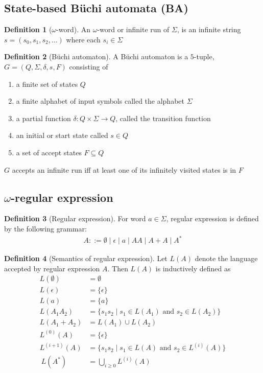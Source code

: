 \documentclass[preprint,12pt]{elsarticle}
\theoremstyle{definition}
\newtheorem{definition}{Definition}[section]
\theoremstyle{remark}
\newcommand{\Buchi}{B\"{u}chi }
\begin{document}
\subsection{State-based \Buchi automata (BA)}
\begin{definition}[$\omega$-word]
    An $\omega$-word or infinite run of $\Sigma$, is an infinite string $s = (s_0, s_1, s_2, \dots)$ where each $s_i\in \Sigma$
\end{definition}
\begin{definition}[\Buchi automaton]
    A \Buchi automaton is a $5$-tuple, $G = (Q, \Sigma, \delta, s, F)$ consisting of
    \begin{enumerate}
        \item a finite set of states $Q$
        \item a finite alphabet of input symbols called the alphabet $\Sigma$
        \item a partial function $\delta : Q\times \Sigma \to Q$, called the transition function
        \item an initial or start state called $s\in Q$
        \item a set of accept states $F \subseteq Q$
    \end{enumerate}
    $G$ accepts an infinite run iff at least one of its infinitely visited states is in $F$
\end{definition}

\subsection{$\omega$-regular expression}
\begin{definition}[Regular expression]
    For word $a \in \Sigma$, regular expression is defined by the following grammar:
    \begin{align*}
        A ::= \emptyset \mid \epsilon \mid a \mid AA \mid A + A \mid A^*
    \end{align*}
\end{definition}
\begin{definition}[Semantics of regular expression]
    Let $L(A)$ denote the language accepted by regular expression $A$. Then $L(A)$ is inductively defined as
    \begin{align*}
        L(\emptyset) & = \emptyset \\
        L(\epsilon) & = \{\epsilon\} \\
        L(a) & = \{a\} \\
        L(A_1A_2) & = \{s_1s_2 \mid s_1 \in L(A_1) \text{ and } s_2 \in L(A_2)\} \\
        L(A_1 + A_2) & = L(A_1) \cup L(A_2) \\
        L^{(0)}(A) & = \{\epsilon\} \\
        L^{(i + 1)}(A) & = \{s_1s_2 \mid s_1 \in L(A) \text{ and } s_2 \in L^{(i)}(A)\} \\\
        L(A^*) & = \bigcup_{i \ge 0} L^{(i)}(A)
    \end{align*}
\end{definition}
\end{document}
